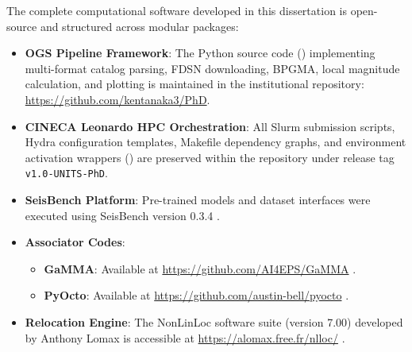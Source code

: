 The complete computational software developed in this dissertation
is open-source and structured across modular packages:
\begin{itemize}
  \item \textbf{\ac{OGS} Pipeline Framework}: The Python source code
    () implementing multi-format catalog parsing,
    \ac{FDSN} downloading, \acf{BPGMA}, local magnitude calculation, and
    plotting is maintained in the institutional repository:
    \url{https://github.com/kentanaka3/PhD}.
  \item \textbf{\ac{CINECA} Leonardo \ac{HPC} Orchestration}: All Slurm
    submission scripts, Hydra configuration templates, Makefile
    dependency graphs, and environment activation wrappers
    () are preserved within the
    repository under release tag \texttt{v1.0-UNITS-PhD}.
  \item \textbf{SeisBench Platform}: Pre-trained models and dataset
    interfaces were executed using SeisBench version 0.3.4
    \parencite{SeisBench}.
  \item \textbf{Associator Codes}:
    \begin{itemize}
      \item \textbf{\ac{GaMMA}}: Available at
        \url{https://github.com/AI4EPS/GaMMA} \parencite{GaMMA}.
      \item \textbf{\ac{PyOcto}}: Available at
        \url{https://github.com/austin-bell/pyocto} \parencite{PyOcto}.
    \end{itemize}
  \item \textbf{Relocation Engine}: The \ac{NonLinLoc} software suite
    (version 7.00) developed by Anthony Lomax is accessible at
    \url{https://alomax.free.fr/nlloc/} \parencite{NonLinLoc}.
\end{itemize}
